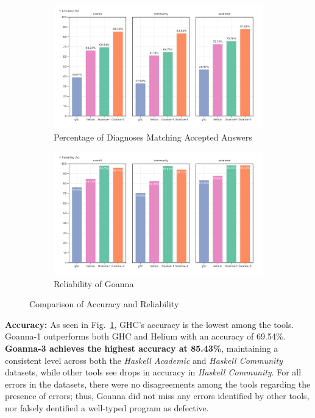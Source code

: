 \documentclass[pdflatex,sn-nature,Numbered]{sn-jnl}%
\begin{document}
\begin{figure}[ht!]
    \centering
    \begin{subfigure}{0.49\linewidth}
        \centering
        \includegraphics[width=\linewidth]{images/accuracy.png}
        \caption{Percentage of Diagnoses Matching Accepted Answers} 
        \label{fig:accuracy}
    \end{subfigure}
    \hfill
    \begin{subfigure}{0.49\linewidth}
        \centering
        \includegraphics[width=\linewidth]{images/Reliability.png}
        \caption{Reliability of Goanna} 
        \label{fig:reliability}
    \end{subfigure}
    \caption{Comparison of Accuracy and Reliability}
\end{figure}

\textbf{Accuracy:} As seen in Fig.~\ref{fig:accuracy}, GHC's accuracy is the lowest among the tools. Goanna-1 outperforms both GHC and Helium with an accuracy of 69.54\%. \textbf{Goanna-3 achieves the highest accuracy at 85.43\%}, maintaining a consistent level across both the \textit{Haskell Academic} and \textit{Haskell Community} datasets, while other tools see drops in accuracy in \textit{Haskell Community}. For all errors in the datasets, there were no disagreements among the tools regarding the presence of errors; thus, Goanna did not miss any errors identified by other tools, nor falsely dentified a well-typed program as defective.
\end{document}
